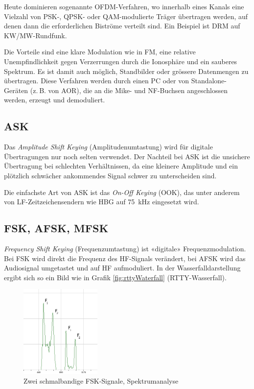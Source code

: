 Heute dominieren sogenannte OFDM-Verfahren, wo innerhalb eines Kanals eine Vielzahl von PSK-, QPSK- oder QAM-modulierte Träger übertragen werden, auf denen dann die erforderlichen Biströme verteilt sind. Ein Beispiel ist DRM auf KW/MW-Rundfunk. 

Die Vorteile sind eine klare Modulation wie in FM, eine relative Unempfindlichkeit gegen Verzerrungen durch die Ionosphäre und ein sauberes Spektrum. Es ist damit auch möglich, Standbilder oder grössere Datenmengen zu übertragen. Diese Verfahren werden durch einen PC oder von Standalone-Geräten (z. B. von AOR), die an die Mike- und NF-Buchsen angeschlossen werden, erzeugt und demoduliert.

\subsection{ASK}
Das \textit{Amplitude Shift Keying} (Amplitudenumtastung) wird für digitale Übertragungen nur noch selten verwendet. Der Nachteil bei ASK ist die unsichere Übertragung bei schlechten Verhältnissen, da eine kleinere Amplitude und ein plötzlich schwächer ankommendes Signal schwer zu unterscheiden sind. 

Die einfachste Art von ASK ist das \textit{On-Off Keying} (OOK), das unter anderem von LF-Zeitzeichensendern wie HBG auf 75 kHz eingesetzt wird.

\subsection{FSK, AFSK, MFSK}\label{sec:fsk}
\textit{Frequency Shift Keying} (Frequenzumtastung) ist «digitale» Frequenzmodulation. Bei FSK wird direkt die Frequenz des HF-Signals verändert, bei AFSK wird das Audiosignal umgetastet und auf HF aufmoduliert. In der Wasserfalldarstellung ergibt sich so ein Bild wie in Grafik \ref{fig:rttyWaterfall} (RTTY-Wasserfall).

\begin{figure}[h!]
 \centering
 \includegraphics[width=4cm]{./png/FSK-Analysis.png}
 \caption{Zwei schmalbandige FSK-Signale, Spektrumanalyse}
 \label{fig:fsk}
\end{figure}

